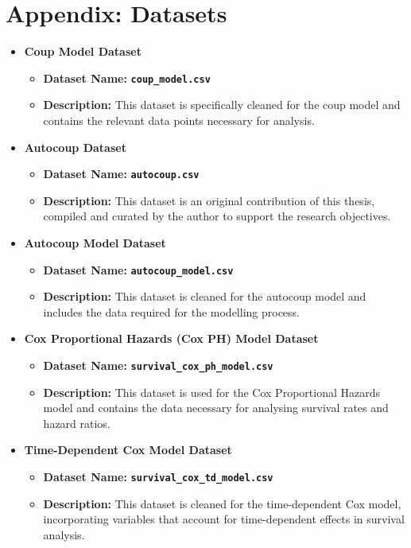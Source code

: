\documentclass[
  12pt,
]{report}
\begin{document}
\chapter*{\texorpdfstring{Appendix\textbf{:
Datasets}}{Appendix: Datasets}}\label{appendix-datasets}

\begin{itemize}
\item
  \textbf{Coup Model Dataset}

  \begin{itemize}
  \item
    \textbf{Dataset Name:} \textbf{\texttt{coup\_model.csv}}
  \item
    \textbf{Description:} This dataset is specifically cleaned for the
    coup model and contains the relevant data points necessary for
    analysis.
  \end{itemize}
\item
  \textbf{Autocoup Dataset}

  \begin{itemize}
  \item
    \textbf{Dataset Name:} \textbf{\texttt{autocoup.csv}}
  \item
    \textbf{Description:} This dataset is an original contribution of
    this thesis, compiled and curated by the author to support the
    research objectives.
  \end{itemize}
\item
  \textbf{Autocoup Model Dataset}

  \begin{itemize}
  \item
    \textbf{Dataset Name:} \textbf{\texttt{autocoup\_model.csv}}
  \item
    \textbf{Description:} This dataset is cleaned for the autocoup model
    and includes the data required for the modelling process.
  \end{itemize}
\item
  \textbf{Cox Proportional Hazards (Cox PH) Model Dataset}

  \begin{itemize}
  \item
    \textbf{Dataset Name:}
    \textbf{\texttt{survival\_cox\_ph\_model.csv}}
  \item
    \textbf{Description:} This dataset is used for the Cox Proportional
    Hazards model and contains the data necessary for analysing survival
    rates and hazard ratios.
  \end{itemize}
\item
  \textbf{Time-Dependent Cox Model Dataset}

  \begin{itemize}
  \item
    \textbf{Dataset Name:}
    \textbf{\texttt{survival\_cox\_td\_model.csv}}
  \item
    \textbf{Description:} This dataset is cleaned for the time-dependent
    Cox model, incorporating variables that account for time-dependent
    effects in survival analysis.
  \end{itemize}
\end{itemize}
\end{document}
